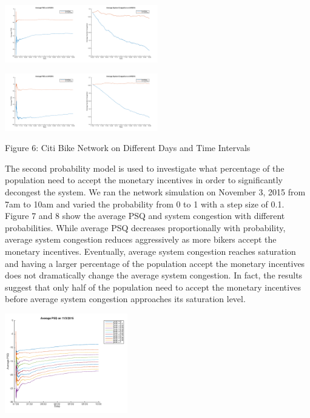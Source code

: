 \documentclass[times, 10pt,twocolumn]{article}
\begin{document}
\centerline{\includegraphics[width=0.25\textwidth]{m4/Average_PSQ_June4.png}\includegraphics[width=0.25\textwidth]{m4/System_Congestion_June4.png}}
\centerline{\includegraphics[width=0.25\textwidth]{m4/Average_PSQ_Aug4.png}\includegraphics[width=0.25\textwidth]{m4/System_Congestion_Aug4.png}}
\centerline{Figure 6: Citi Bike Network on Different Days and Time Intervals}
\hfill \break
The second probability model is used to investigate what percentage of the population need to accept the monetary incentives in order to significantly decongest the system. We ran the network simulation on November 3, 2015 from 7am to 10am and varied the probability from 0 to 1 with a step size of 0.1. Figure 7 and 8 show the average PSQ and system congestion with different probabilities. While average PSQ decreases proportionally with probability, average system congestion reduces aggressively as more bikers accept the monetary incentives. Eventually, average system congestion reaches saturation and having a larger percentage of the population accept the monetary incentives does not dramatically change the average system congestion. In fact, the results suggest that only half of the population need to accept the monetary incentives before average system congestion approaches its saturation level.
\centerline{\includegraphics[width=0.4\textwidth]{m4/Average_PSQ_Nov3_Prob.png}}
\end{document}
